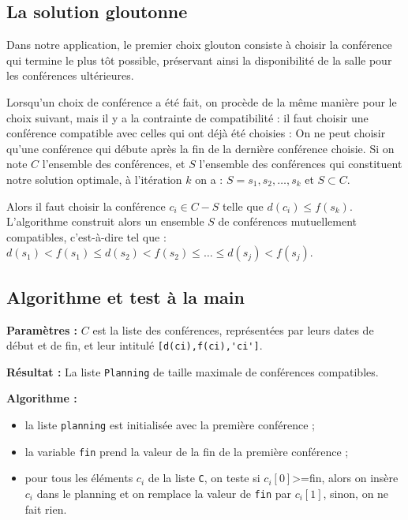 \subsection*{La solution gloutonne}

Dans notre application, le premier choix glouton consiste à choisir la conférence qui termine le plus tôt possible, préservant ainsi la disponibilité de la salle pour les conférences ultérieures.

Lorsqu'un choix de conférence a été fait, on procède de la même manière pour le choix suivant, mais il y a la contrainte de compatibilité : il faut choisir une conférence compatible avec celles qui ont déjà été choisies : On ne peut choisir qu'une conférence qui débute après la fin de la dernière conférence choisie. Si on note $C$ l'ensemble des conférences, et $S$ l'ensemble des conférences qui constituent notre solution optimale, à l'itération $k$ on a :
$S={s_1,s_2,\ldots,s_k}$ et $S\subset C$.

Alors il faut choisir la conférence $c_i \in C-S$ telle que $d(c_i )\leq f(s_k)$. 
L’algorithme construit alors un ensemble $S$ de conférences mutuellement compatibles, c’est-à-dire tel que :
$d(s_1 )<f(s_1 )\leq d(s_2)<f(s_2)\leq \ldots \leq d(s_j )<f(s_j)$.

\subsection*{Algorithme et test à la main }

\textbf{Paramètres : } $C$ est la liste des conférences, représentées par leurs dates de début et de fin, et leur intitulé \lstinline{[d(ci),f(ci),'ci']}.

\textbf{Résultat : } La liste \lstinline{Planning} de taille maximale de conférences compatibles.

\textbf{Algorithme : }
\begin{itemize}
\item la liste \lstinline{planning} est initialisée avec la première conférence ;
\item la variable \lstinline{fin} prend la valeur de la fin de la première conférence ;
\item pour tous les éléments $c_i$ de la liste \lstinline{C}, on teste si $c_i[0]$>=fin, alors on insère $c_i$ dans le planning et on remplace la valeur de \lstinline{fin} par $c_i[1]$, sinon, on ne fait rien.
\end{itemize}




